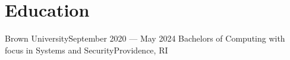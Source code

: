 \section{Education}
    \resumeSubHeadingListStart

    \resumeSubheading
    {Brown University}{September 2020 --- May 2024}
    {Bachelors of Computing with focus in Systems and Security}{Providence, RI}
    \resumeItemListStart
    \resumeItemListEnd

    \resumeSubHeadingListEnd
